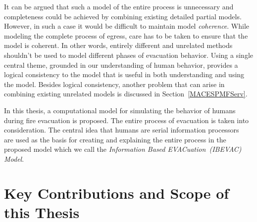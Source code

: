It can be argued that such a model of the entire process is unnecessary and completeness could be achieved by combining existing detailed partial models. However, in such a case it would be difficult to maintain model \emph{coherence}. While modeling the complete process of egress, care has to be taken to ensure that the model is coherent. In other words, entirely different and unrelated methods shouldn't be used to model different phases of evacuation behavior. Using a single central theme, grounded in our understanding of human behavior, provides a logical consistency to the model that is useful in both understanding and using the model. Besides logical consistency, another problem that can arise in combining existing unrelated models is discussed in Section~\ref{MACESPMFServ}.

In this thesis, a computational model for simulating the behavior of humans during fire evacuation is proposed. The entire process of evacuation is taken into consideration. The central idea that humans are serial information processors~\cite{Ozel:2001tn} are used as the basis for creating and explaining the entire process in the proposed model which we call the \emph{Information Based EVACuation~(IBEVAC) Model}.


\section{Key Contributions and Scope of this Thesis}
\label{Intro:Contributions}

